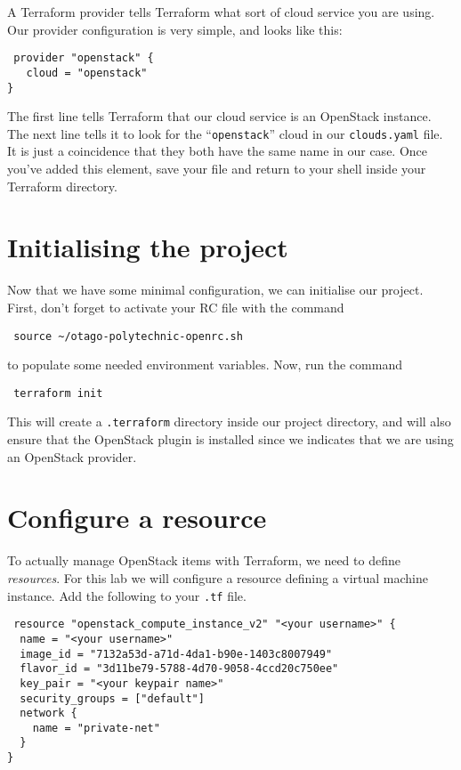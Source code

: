 \documentclass{article}
\begin{document}
A Terraform provider tells Terraform what sort of cloud service you are using. 
Our provider configuration is very simple, and looks like this:

\begin{verbatim}
 provider "openstack" {
   cloud = "openstack"
}
\end{verbatim}

The first line tells Terraform that our cloud service is an OpenStack instance. The next line
tells it to look for the ``\texttt{openstack}'' cloud in our \texttt{clouds.yaml} file. It
is just a coincidence that they both have the same name in our case. Once you've added this element, 
save your file and return to your shell inside your Terraform directory.

\section{Initialising the project}
Now that we have some minimal configuration, we can initialise our project. First, don't forget to 
activate your RC file with the command

\begin{verbatim}
 source ~/otago-polytechnic-openrc.sh
\end{verbatim}

to populate some needed environment variables. Now, run the command

\begin{verbatim}
 terraform init
\end{verbatim}

This will create a \texttt{.terraform} directory inside our project directory, and will also ensure that 
the OpenStack plugin is installed since we indicates that we are using an OpenStack provider.

\section{Configure a resource}
To actually manage OpenStack items with Terraform, we need to define \emph{resources}. For
this lab we will configure a resource defining a virtual machine instance. Add the following 
to your \texttt{.tf} file.

\begin{verbatim}
 resource "openstack_compute_instance_v2" "<your username>" {
  name = "<your username>"
  image_id = "7132a53d-a71d-4da1-b90e-1403c8007949"
  flavor_id = "3d11be79-5788-4d70-9058-4ccd20c750ee"
  key_pair = "<your keypair name>"
  security_groups = ["default"]
  network {
    name = "private-net"
  }
}
\end{verbatim}
\end{document}
